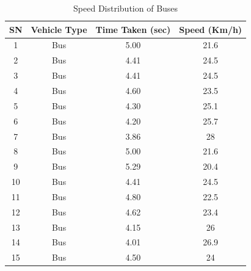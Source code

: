 \begin{table}[h!]
    \centering
    \caption{Speed Distribution of Buses}
    \begin{tabular}{|c|c|c|c|}
        \hline
        \textbf{SN}	& \textbf{Vehicle Type}	& \textbf{Time Taken (sec)}	& \textbf{Speed (Km/h)} \\ \hline
        1&	Bus	&5.00	&21.6 \\ \hline
        2&	Bus	&4.41	&24.5 \\ \hline
        3&	Bus	&4.41	&24.5 \\ \hline
        4&	Bus	&4.60	&23.5 \\ \hline
        5&	Bus	&4.30	&25.1 \\ \hline
        6&	Bus	&4.20	&25.7 \\ \hline
        7&	Bus	&3.86	&28 \\ \hline
        8&	Bus	&5.00	&21.6 \\ \hline
        9&	Bus	&5.29	&20.4 \\ \hline
        10&	Bus	&4.41	&24.5 \\ \hline
        11&	Bus	&4.80	&22.5 \\ \hline
        12&	Bus	&4.62	&23.4 \\ \hline
        13&	Bus	&4.15	&26 \\ \hline
        14&	Bus	&4.01	&26.9 \\ \hline
        15&	Bus	&4.50	&24 \\ \hline
    \end{tabular}
\end{table}

